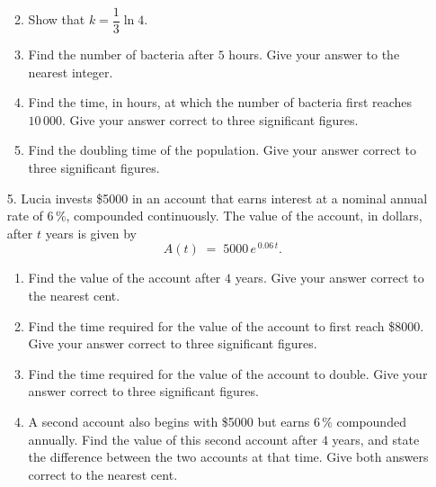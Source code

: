 \documentclass[12pt, twoside]{article}
\begin{document}
\begin{enumerate}[itemsep=0.4cm]
\begin{enumerate}[label=(\alph*), itemsep=0.3cm]
  \vspace{1.6cm}

  \item Show that $k = \dfrac{1}{3}\ln 4$.

  \vspace{2.6cm}

  \item Find the number of bacteria after $5$ hours. Give your answer to
  the nearest integer.

  \vspace{2.4cm}

  \item Find the time, in hours, at which the number of bacteria first
  reaches $10\,000$. Give your answer correct to three significant
  figures.

  \vspace{2.4cm}

  \item Find the doubling time of the population. Give your answer
  correct to three significant figures.

  \vspace{2cm}
\end{enumerate}

\newpage

\item[5.] Lucia invests \$5000 in an account that earns interest at a
nominal annual rate of $6\,\%$, compounded continuously. The value of the
account, in dollars, after $t$ years is given by
$$A(t) \;=\; 5000\, e^{\,0.06\, t}.$$

\begin{enumerate}[label=(\alph*), itemsep=0.3cm]
  \item Find the value of the account after $4$ years. Give your answer
  correct to the nearest cent.

  \vspace{2.5cm}

  \item Find the time required for the value of the account to first
  reach \$8000. Give your answer correct to three significant figures.

  \vspace{3cm}

  \item Find the time required for the value of the account to double.
  Give your answer correct to three significant figures.

  \vspace{3cm}

  \item A second account also begins with \$5000 but earns $6\,\%$
  compounded annually. Find the value of this second account after
  $4$ years, and state the difference between the two accounts at that
  time. Give both answers correct to the nearest cent.

  \vspace{4cm}
\end{enumerate}

\end{enumerate}
\end{document}
